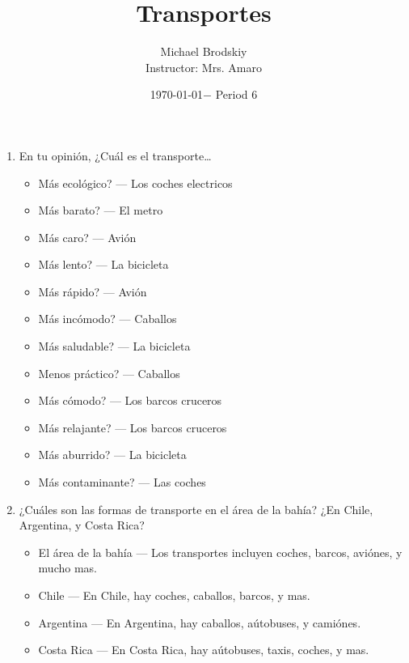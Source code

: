 \documentclass[12pt]{article}
\title{Transportes}
\date{\today $-$ Period 6}
\author{Michael Brodskiy\\ \small Instructor: Mrs. Amaro}
\begin{document}
\maketitle

\begin{enumerate}

  \item En tu opini\'on, ¿Cu\'al es el transporte\dots 

    \begin{itemize}

      \item M\'as ecol\'ogico? — Los coches electricos

      \item M\'as barato? — El metro

      \item M\'as caro? — Avi\'on

      \item M\'as lento? — La bicicleta 

      \item M\'as r\'apido? — Avi\'on

      \item M\'as inc\'omodo? — Caballos

      \item M\'as saludable? — La bicicleta 

      \item Menos pr\'actico? — Caballos

      \item M\'as c\'omodo? — Los barcos cruceros

      \item M\'as relajante? — Los barcos cruceros

      \item M\'as aburrido? — La bicicleta

      \item M\'as contaminante? — Las coches

    \end{itemize}

  \item ¿Cu\'ales son las formas de transporte en el \'area de la bah\'ia? ¿En Chile, Argentina, y Costa Rica?

    \begin{itemize}

      \item El \'area de la bah\'ia — Los transportes incluyen coches, barcos, avi\'ones, y mucho mas.

      \item Chile — En Chile, hay coches, caballos, barcos, y mas.

      \item Argentina — En Argentina, hay caballos, a\'utobuses, y cami\'ones.

      \item Costa Rica — En Costa Rica, hay a\'utobuses, taxis, coches, y mas.

    \end{itemize}

\end{enumerate}
\end{document}
